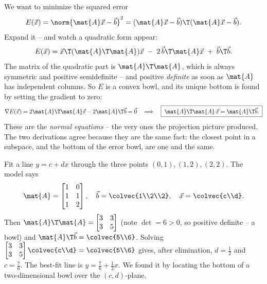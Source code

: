 We want to minimize the squared error
\[
  E(\vec{x}) = \norm{\mat{A}\vec{x}-\vec{b}}^2 = (\mat{A}\vec{x}-\vec{b})\T(\mat{A}\vec{x}-\vec{b}).
\]
Expand it -- and watch a quadratic form appear:
\[
  E(\vec{x}) = \vec{x}\T(\mat{A}\T\mat{A})\vec{x} \;-\; 2\,\vec{b}\T\mat{A}\vec{x} \;+\; \vec{b}\T\vec{b}.
\]
The matrix of the quadratic part is $\mat{A}\T\mat{A}$, which is always symmetric and
positive semidefinite -- and positive \emph{definite} as soon as $\mat{A}$ has
independent columns. So $E$ is a convex bowl, and its unique bottom is found by
setting the gradient to zero:
\[
  \nabla E(\vec{x}) = 2\mat{A}\T\mat{A}\vec{x} - 2\mat{A}\T\vec{b} = \vec0
  \quad\Longrightarrow\quad \boxed{\;\mat{A}\T\mat{A}\,\vec{x} = \mat{A}\T\vec{b}.\;}
\]
These are the \emph{normal equations} -- the very ones the projection picture
produced. The two derivations agree because they are the same fact: the closest point
in a subspace, and the bottom of the error bowl, are one and the same.

\begin{example}
\label{ch36:ex-lsq}
Fit a line $y = c + dx$ through the three points $(0,1),(1,2),(2,2)$. The model says
\[
  \mat{A}=\begin{bmatrix}1&0\\1&1\\1&2\end{bmatrix},\quad
  \vec{b}=\colvec{1\\2\\2},\quad
  \vec{x}=\colvec{c\\d}.
\]
Then $\mat{A}\T\mat{A}=\begin{bmatrix}3&3\\3&5\end{bmatrix}$ (note $\det=6>0$, so
positive definite -- a bowl) and $\mat{A}\T\vec{b}=\colvec{5\\6}$. Solving
$\begin{bmatrix}3&3\\3&5\end{bmatrix}\colvec{c\\d}=\colvec{5\\6}$ gives, after
elimination, $d=\tfrac12$ and $c=\tfrac76$. The best-fit line is $y=\tfrac76+\tfrac12
x$. We found it by locating the bottom of a two-dimensional bowl over the
$(c,d)$-plane.
\end{example}

